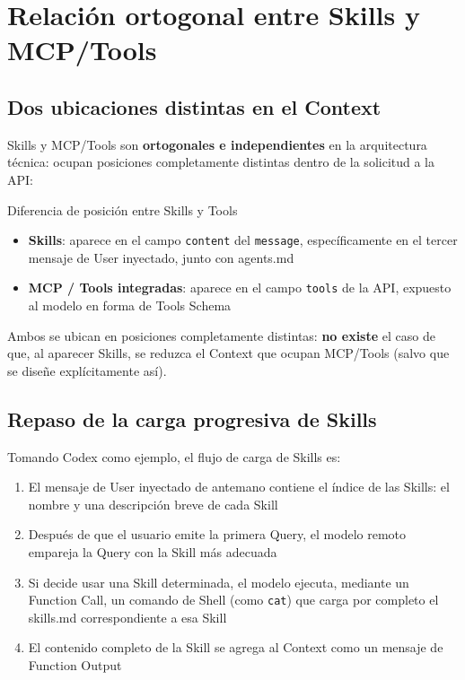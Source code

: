 \section{Relación ortogonal entre Skills y MCP/Tools}

\subsection{Dos ubicaciones distintas en el Context}

Skills y MCP/Tools son \textbf{ortogonales e independientes} en la arquitectura técnica: ocupan posiciones completamente distintas dentro de la solicitud a la API:

\begin{importantbox}{Diferencia de posición entre Skills y Tools}
\begin{itemize}
    \item \textbf{Skills}: aparece en el campo \texttt{content} del \texttt{message}, específicamente en el tercer mensaje de User inyectado, junto con agents.md
    \item \textbf{MCP / Tools integradas}: aparece en el campo \texttt{tools} de la API, expuesto al modelo en forma de Tools Schema
\end{itemize}
Ambos se ubican en posiciones completamente distintas: \textbf{no existe} el caso de que, al aparecer Skills, se reduzca el Context que ocupan MCP/Tools (salvo que se diseñe explícitamente así).
\end{importantbox}

\subsection{Repaso de la carga progresiva de Skills}

Tomando Codex como ejemplo, el flujo de carga de Skills es:

\begin{enumerate}
    \item El mensaje de User inyectado de antemano contiene el índice de las Skills: el nombre y una descripción breve de cada Skill
    \item Después de que el usuario emite la primera Query, el modelo remoto empareja la Query con la Skill más adecuada
    \item Si decide usar una Skill determinada, el modelo ejecuta, mediante un Function Call, un comando de Shell (como \texttt{cat}) que carga por completo el skills.md correspondiente a esa Skill
    \item El contenido completo de la Skill se agrega al Context como un mensaje de Function Output
\end{enumerate}


